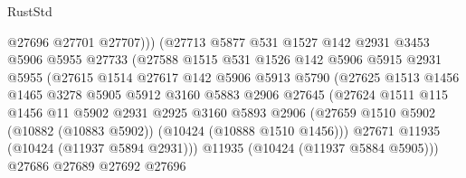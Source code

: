 \begin{lexlean}{RustStd}
\begin{coremodule}
                                @27696
                                @27701
                                @27707)))
                          (@27713
                            @5877
                            @531
                            @1527
                            @142
                            @2931
                            @3453
                            @5906
                            @5955
                            @27733
                            (@27588
                              @1515
                              @531
                              @1526
                              @142
                              @5906
                              @5915
                              @2931
                              @5955
                              (@27615
                                @1514
                                @27617
                                @142
                                @5906
                                @5913
                                @5790
                                (@27625
                                  @1513
                                  @1456
                                  @1465
                                  @3278
                                  @5905
                                  @5912
                                  @3160
                                  @5883
                                  @2906
                                  @27645
                                  (@27624
                                    @1511
                                    @115
                                    @1456
                                    @11
                                    @5902
                                    @2931
                                    @2925
                                    @3160
                                    @5893
                                    @2906
                                    (@27659
                                      @1510
                                      @5902
                                      (@10882 (@10883 @5902))
                                      (@10424 (@10888 @1510 @1456)))
                                    @27671
                                    @11935
                                    (@10424 (@11937 @5894 @2931)))
                                  @11935
                                  (@10424 (@11937 @5884 @5905)))
                                @27686
                                @27689
                                @27692
                                @27696

\end{coremodule}
\end{lexlean}
